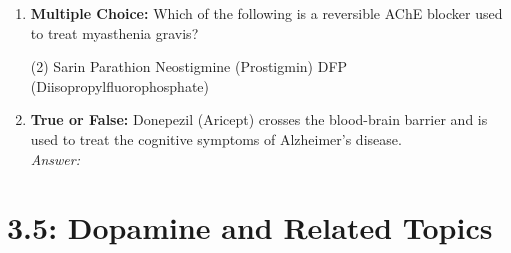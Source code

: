 \begin{enumerate}[label=\textbf{Q3.4.\arabic*}]
    \item \textbf{Multiple Choice:} Which of the following is a reversible AChE blocker used to treat myasthenia gravis?
        \begin{tasks}[label=\textcolor{\documentTheme}{(\Alph*)}, item-format=\color{\documentTheme}, label-width=1.5em, item-indent=1.7em](2)
            \task Sarin
            \task Parathion
            \task Neostigmine (Prostigmin)
            \task DFP (Diisopropylfluorophosphate)
        \end{tasks}

    \item \textbf{True or False:} Donepezil (Aricept) crosses the blood-brain barrier and is used to treat the cognitive symptoms of Alzheimer's disease. \\
        \textit{Answer:} %
\end{enumerate}

\squigglyline
\section*{3.5: Dopamine and Related Topics}

